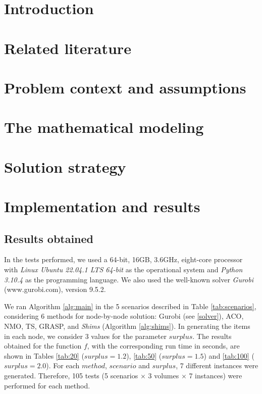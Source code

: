 \documentclass[preprint]{elsarticle}
\begin{document}
\section{Introduction}
\section{Related literature}
\section{Problem context and assumptions}
\section{The mathematical modeling}
\section{Solution strategy}
\section{Implementation and results}
\label{sec6}

\subsection{Results obtained}

In the tests performed, we used a 64-bit, 16GB, 3.6GHz, eight-core processor with {\it Linux Ubuntu 22.04.1 LTS 64-bit} as the operational system and {\it Python 3.10.4}\/ as the programming language. We also used the well-known solver {\it Gurobi}\/ (www.gurobi.com), version 9.5.2.

We ran Algorithm \ref{alg:main} in the 5 scenarios described in Table \ref{tab:scenarios}, considering 6 methods for node-by-node solution: Gurobi (see \ref{solver}), ACO, NMO, TS, GRASP, and {\it Shims} (Algorithm \ref{alg:shims}). In generating the items in each node, we consider 3 values for the parameter $surplus$. The results obtained for the function $f$, with the corresponding run time in seconds, are shown in Tables \ref{tab:20} ($surplus = 1.2$), \ref{tab:50} ($surplus = 1.5$) and \ref{tab:100} ($surplus = 2.0$). For each $method$, $scenario$\/ and $surplus$, 7 different instances were generated. Therefore, 105 tests (5 scenarios $\times$\/ 3 volumes $\times$\/ 7 instances) were performed for each method. 
\end{document}
